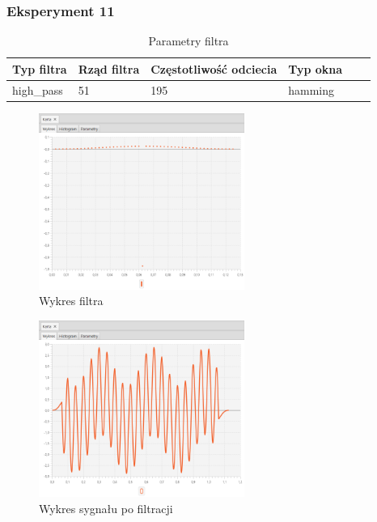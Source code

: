 \documentclass[12pt]{article}
\begin{document}
{{            \subsubsection{Eksperyment 11} {
                \begin{table}[H]
                \centering
                \begin{tabular}{|l|l|l|l|l|l|}
                \hline
                Typ filtra & Rząd filtra & Częstotliwość odciecia & Typ okna  \\\hline
                 high\_pass & 51 & 195 & hamming     \\\hline
                \end{tabular}
                \caption{Parametry filtra}
                \end{table}
                \begin{figure}[H]
                \centering
                \includegraphics[width=0.6\textwidth]{img/result/filter/experiment11/data_draw_3d_filter_data_114210.png}
                \caption{Wykres filtra}
                \end{figure}

                \begin{figure}[H]
                \centering
                \includegraphics[width=0.6\textwidth]{img/result/filter/experiment11/data_draw_3d_result_reconstr_data_114319.png}
                \caption{Wykres sygnału po filtracji}
                \end{figure}
            }
            \newpage

}}
\end{document}

